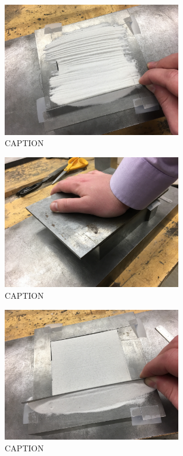 \begin{figure}
	\centering
        \includegraphics[width=0.7\textwidth]{appendix_sample_prep/dds_cutup_sample.jpg}
   	\caption{CAPTION}
  	\label{Fig:dds_cutup_sample}
\end{figure}

\begin{figure}
	\centering
        \includegraphics[width=0.7\textwidth]{appendix_sample_prep/dds_press_sample.jpg}
   	\caption{CAPTION}
  	\label{Fig:dds_press_sample}
\end{figure}

\clearpage

\begin{figure}
	\centering
        \includegraphics[width=0.7\textwidth]{appendix_sample_prep/dds_level_sample.jpg}
   	\caption{CAPTION}
  	\label{Fig:dds_level_sample}
\end{figure}

